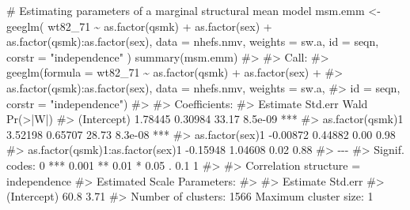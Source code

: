 \documentclass[
  10pt,
  a4paper,
]{book}
\newenvironment{Shaded}{\begin{snugshade}}{\end{snugshade}}
\newcommand{\AttributeTok}[1]{\textcolor[rgb]{0.40,0.45,0.13}{#1}}
\newcommand{\CommentTok}[1]{\textcolor[rgb]{0.37,0.37,0.37}{#1}}
\newcommand{\FunctionTok}[1]{\textcolor[rgb]{0.28,0.35,0.67}{#1}}
\newcommand{\NormalTok}[1]{\textcolor[rgb]{0.00,0.46,0.62}{#1}}
\newcommand{\OtherTok}[1]{\textcolor[rgb]{0.00,0.46,0.62}{#1}}
\newcommand{\SpecialCharTok}[1]{\textcolor[rgb]{0.37,0.37,0.37}{#1}}
\newcommand{\StringTok}[1]{\textcolor[rgb]{0.13,0.47,0.30}{#1}}
\begin{document}
\begin{Shaded}
\begin{Highlighting}[]
\CommentTok{\# Estimating parameters of a marginal structural mean model}
\NormalTok{msm.emm }\OtherTok{\textless{}{-}} \FunctionTok{geeglm}\NormalTok{(}
\NormalTok{  wt82\_71 }\SpecialCharTok{\textasciitilde{}} \FunctionTok{as.factor}\NormalTok{(qsmk) }\SpecialCharTok{+} \FunctionTok{as.factor}\NormalTok{(sex)}
  \SpecialCharTok{+} \FunctionTok{as.factor}\NormalTok{(qsmk)}\SpecialCharTok{:}\FunctionTok{as.factor}\NormalTok{(sex),}
  \AttributeTok{data =}\NormalTok{ nhefs.nmv,}
  \AttributeTok{weights =}\NormalTok{ sw.a,}
  \AttributeTok{id =}\NormalTok{ seqn,}
  \AttributeTok{corstr =} \StringTok{"independence"}
\NormalTok{)}
\FunctionTok{summary}\NormalTok{(msm.emm)}
\CommentTok{\#\textgreater{} }
\CommentTok{\#\textgreater{} Call:}
\CommentTok{\#\textgreater{} geeglm(formula = wt82\_71 \textasciitilde{} as.factor(qsmk) + as.factor(sex) + }
\CommentTok{\#\textgreater{}     as.factor(qsmk):as.factor(sex), data = nhefs.nmv, weights = sw.a, }
\CommentTok{\#\textgreater{}     id = seqn, corstr = "independence")}
\CommentTok{\#\textgreater{} }
\CommentTok{\#\textgreater{}  Coefficients:}
\CommentTok{\#\textgreater{}                                  Estimate  Std.err  Wald Pr(\textgreater{}|W|)    }
\CommentTok{\#\textgreater{} (Intercept)                       1.78445  0.30984 33.17  8.5e{-}09 ***}
\CommentTok{\#\textgreater{} as.factor(qsmk)1                  3.52198  0.65707 28.73  8.3e{-}08 ***}
\CommentTok{\#\textgreater{} as.factor(sex)1                  {-}0.00872  0.44882  0.00     0.98    }
\CommentTok{\#\textgreater{} as.factor(qsmk)1:as.factor(sex)1 {-}0.15948  1.04608  0.02     0.88    }
\CommentTok{\#\textgreater{} {-}{-}{-}}
\CommentTok{\#\textgreater{} Signif. codes:  0 \textquotesingle{}***\textquotesingle{} 0.001 \textquotesingle{}**\textquotesingle{} 0.01 \textquotesingle{}*\textquotesingle{} 0.05 \textquotesingle{}.\textquotesingle{} 0.1 \textquotesingle{} \textquotesingle{} 1}
\CommentTok{\#\textgreater{} }
\CommentTok{\#\textgreater{} Correlation structure = independence }
\CommentTok{\#\textgreater{} Estimated Scale Parameters:}
\CommentTok{\#\textgreater{} }
\CommentTok{\#\textgreater{}             Estimate Std.err}
\CommentTok{\#\textgreater{} (Intercept)     60.8    3.71}
\CommentTok{\#\textgreater{} Number of clusters:   1566  Maximum cluster size: 1}


\end{Highlighting}
\end{Shaded}
\end{document}
